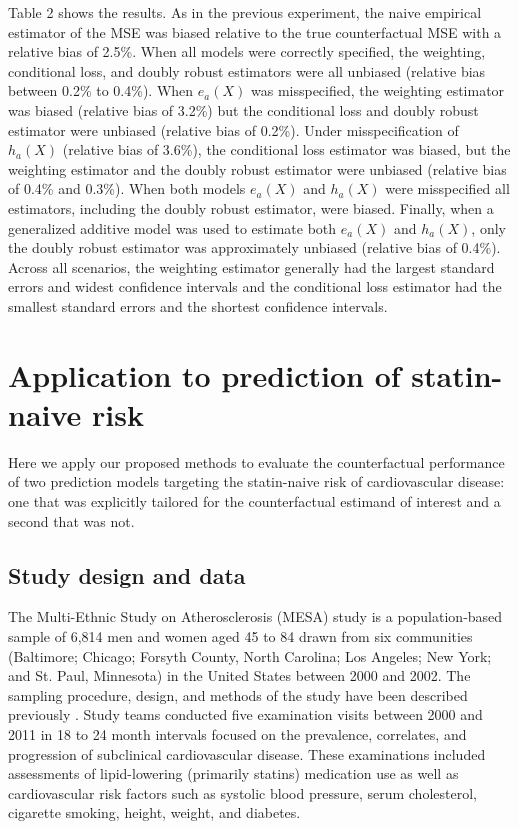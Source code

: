 Table 2 shows the results. As in the previous experiment, the naive empirical estimator of the MSE was biased relative to the true counterfactual MSE with a relative bias of 2.5\%. When all models were correctly specified, the weighting, conditional loss, and doubly robust estimators were all unbiased (relative bias between 0.2\% to 0.4\%). When $e_a(X)$ was misspecified, the weighting estimator was biased (relative bias of 3.2\%) but the conditional loss and doubly robust estimator were unbiased (relative bias of 0.2\%). Under misspecification of $h_a(X)$ (relative bias of 3.6\%), the conditional loss estimator was biased, but the weighting estimator and the doubly robust estimator were unbiased (relative bias of 0.4\% and 0.3\%). When both models $e_a(X)$ and $h_a(X)$ were misspecified all estimators, including the doubly robust estimator, were biased. Finally, when a generalized additive model was used to estimate both $e_a(X)$ and $h_a(X)$, only the doubly robust estimator was approximately unbiased (relative bias of 0.4\%). Across all scenarios, the weighting estimator generally had the largest standard errors and widest confidence intervals and the conditional loss estimator had the smallest standard errors and the shortest confidence intervals.

\section{Application to prediction of statin-naive risk} \label{sec:results}
Here we apply our proposed methods to evaluate the counterfactual performance of two prediction models targeting the statin-naive risk of cardiovascular disease: one that was explicitly tailored for the counterfactual estimand of interest and a second that was not. 

\subsection{Study design and data}
The Multi-Ethnic Study on Atherosclerosis (MESA) study is a population-based sample of 6,814 men and women aged 45 to 84 drawn from six communities (Baltimore; Chicago; Forsyth County, North Carolina; Los Angeles; New York; and St. Paul, Minnesota) in the United States between 2000 and 2002. The sampling procedure, design, and methods of the study have been described previously \cite{bild_multi-ethnic_2002}. Study teams conducted five examination visits between 2000 and 2011 in 18 to 24 month intervals focused on the prevalence, correlates, and progression of subclinical cardiovascular disease. These examinations included assessments of lipid-lowering (primarily statins) medication use as well as cardiovascular risk factors such as systolic blood pressure, serum cholesterol, cigarette smoking, height, weight, and diabetes. 

